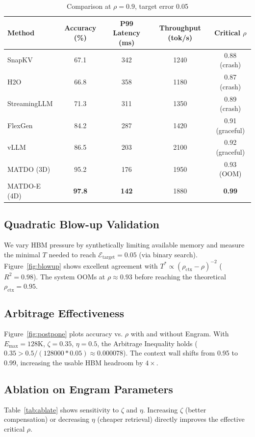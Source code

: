 \documentclass[11pt,a4paper]{article}
\theoremstyle{plain}
\theoremstyle{definition}
\begin{document}
\begin{table}[t]
\centering
\caption{Comparison at $\rho=0.9$, target error 0.05}
\begin{tabular}{@{}lcccc@{}}
\toprule
Method & Accuracy (\%) & P99 Latency (ms) & Throughput (tok/s) & Critical $\rho$ \\
\midrule
SnapKV & 67.1 & 342 & 1240 & 0.88 (crash) \\
H2O & 66.8 & 358 & 1180 & 0.87 (crash) \\
StreamingLLM & 71.3 & 311 & 1350 & 0.89 (crash) \\
FlexGen & 84.2 & 287 & 1420 & 0.91 (graceful) \\
vLLM & 86.5 & 203 & 2100 & 0.92 (graceful) \\
MATDO (3D) & 95.2 & 176 & 1950 & 0.93 (OOM) \\
MATDO-E (4D) & \textbf{97.8} & \textbf{142} & 1880 & \textbf{0.99} \\
\bottomrule
\end{tabular}
\label{tab:main}
\end{table}

\subsection{Quadratic Blow-up Validation}
We vary HBM pressure by synthetically limiting available memory and measure the minimal $T$ needed to reach $\mathcal{E}_{\text{target}}=0.05$ (via binary search). Figure~\ref{fig:blowup} shows excellent agreement with $T^* \propto (\rho_{\text{ctx}}-\rho)^{-2}$ ($R^2=0.98$). The system OOMs at $\rho\approx0.93$ before reaching the theoretical $\rho_{\text{ctx}}=0.95$.

\subsection{Arbitrage Effectiveness}
Figure~\ref{fig:postpone} plots accuracy vs. $\rho$ with and without Engram. With $E_{\max}=128$K, $\zeta=0.35$, $\eta=0.5$, the Arbitrage Inequality holds ($0.35 > 0.5/(128000*0.05)\approx0.000078$). The context wall shifts from 0.95 to 0.99, increasing the usable HBM headroom by $4\times$.

\subsection{Ablation on Engram Parameters}
Table~\ref{tab:ablate} shows sensitivity to $\zeta$ and $\eta$. Increasing $\zeta$ (better compensation) or decreasing $\eta$ (cheaper retrieval) directly improves the effective critical $\rho$.
\end{document}
